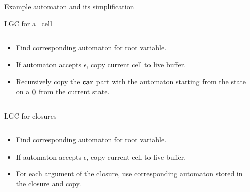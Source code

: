 \documentclass[xcolor=x11names,compress,mathserif]{beamer}
\renewcommand{\(}{\begin{columns}}
\renewcommand{\)}{\end{columns}}
\newcommand{\<}[1]{\begin{column}{#1}}
\renewcommand{\>}{\end{column}}
\begin{document}
\begin{frame}{Example automaton and its simplification}

\end{frame}
\begin{frame}{LGC for a \CONS\ cell}
  \begin{columns}[c]
    \begin{column}{0.45\textwidth}
      \begin{itemize}
      \item Find corresponding automaton for root variable.
      \item If automaton accepts $\epsilon$, copy current cell to live buffer.
      \item Recursively copy the $\mbox{$\mathbf{car}$}$ part with the automaton starting from the state on a $\mathbf{0}$ from the current state.
      \end{itemize}
    \end{column}
    \begin{column}{0.50\textwidth}
    \end{column}
  \end{columns}
\end{frame}

\begin{frame}{LGC for closures}
   \begin{columns}[c]
    \begin{column}{0.45\textwidth}
      \begin{itemize}
      \item Find corresponding automaton for root variable.
      \item If automaton accepts $\epsilon$, copy current cell to live buffer.
      \item For each argument of the closure, use corresponding automaton stored in the closure and copy.
      \end{itemize}
    \end{column}
    \begin{column}{0.50\textwidth}
    \end{column}
   \end{columns}
\end{frame}
\end{document}

